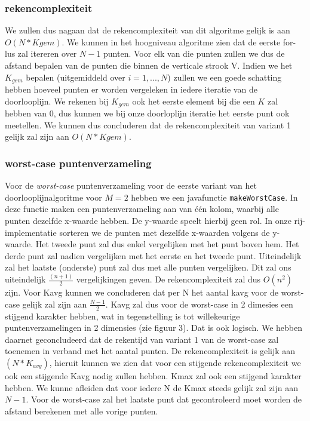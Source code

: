 \documentclass[12pt]{article}
\begin{document}
\subsubsection{rekencomplexiteit}
We zullen dus nagaan dat de rekencomplexiteit van dit algoritme gelijk is aan $O(N*Kgem)$.
We kunnen in het hoogniveau algoritme zien dat de eerste for-lus zal itereren over $N-1$ punten.
Voor elk van die punten zullen we dus de afstand bepalen van de punten die binnen de verticale strook V.
Indien we het $K_{gem}$ bepalen (uitgemiddeld over $i = 1,...,N$) zullen we een goede schatting hebben hoeveel punten er worden vergeleken in iedere iteratie van de doorlooplijn.
We rekenen bij $K_{gem}$ ook het eerste element bij die een $K$ zal hebben van 0, dus kunnen we bij onze doorloplijn iteratie het eerste punt ook meetellen.
We kunnen dus concluderen dat de rekencomplexiteit van variant 1 gelijk zal zijn aan $O(N*Kgem)$.

\subsubsection{worst-case puntenverzameling}
Voor de \textit{worst-case} puntenverzameling voor de eerste variant van het doorlooplijnalgoritme voor $M = 2$ hebben we een javafunctie \texttt{makeWorstCase}.
In deze functie maken een puntenverzameling aan van één kolom, waarbij alle punten dezelfde x-waarde hebben.
De y-waarde speelt hierbij geen rol.
In onze rij-implementatie sorteren we de punten met dezelfde x-waarden volgens de y-waarde.
Het tweede punt zal dus enkel vergelijken met het punt boven hem.
Het derde punt zal nadien vergelijken met het eerste en het tweede punt.
Uiteindelijk zal het laatste (onderste) punt zal dus met alle punten vergelijken.
Dit zal ons uiteindelijk $\frac{(n+1)}{2}$ vergelijkingen geven. De rekencomplexiteit zal dus $O(n^2)$ zijn.
Voor Kavg kunnen we concluderen dat per N het aantal kavg voor de worst-case gelijk zal zijn aan $\frac{N-1}{2}$.
Kavg zal dus voor de worst-case in 2 dimesies een stijgend karakter hebben, wat in tegenstelling is tot willekeurige puntenverzamelingen in 2 dimensies (zie figuur 3).
Dat is ook logisch. We hebben daarnet geconcludeerd dat de rekentijd van variant 1 van de worst-case zal toenemen in verband met het aantal punten.
De rekencomplexiteit is gelijk aan $(N*K_{avg})$, hieruit kunnen we zien dat voor een stijgende rekencomplexiteit we ook een stijgende Kavg nodig zullen hebben.
Kmax zal ook een stijgend karakter hebben. We kunne afleiden dat voor iedere N de Kmax steeds gelijk zal zijn aan $N-1$.
Voor de worst-case zal het laatste punt dat gecontroleerd moet worden de afstand berekenen met alle vorige punten.
\end{document}
